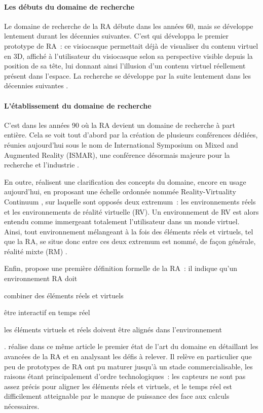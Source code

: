 \paragraph*{Les débuts du domaine de recherche}
Le domaine de recherche de la RA débute dans les années 60, mais se développe lentement durant les décennies suivantes. C'est \citet{Sutherland1968} qui développa le premier prototype de RA~: ce visiocasque permettait déjà de visualiser du contenu virtuel en 3D, affiché à l'utilisateur du visiocasque selon sa perspective visible depuis la position de sa tête, lui donnant ainsi l'illusion d'un contenu virtuel réellement présent dans l'espace. La recherche se développe par la suite lentement dans les décennies suivantes \citep{VanKrevelenPoelman2010} \citep{CarmignianiFurhtAnisettiEtAl2011}.

\paragraph*{L'établissement du domaine de recherche}
C'est dans les années 90 où la RA devient un domaine de recherche à part entière. Cela se voit tout d'abord par la création de plusieurs conférences dédiées, réunies aujourd'hui sous le nom de International Symposium on Mixed and Augmented Reality (ISMAR), une conférence désormais majeure pour la recherche et l'industrie \citep{AzumaBaillotBehringerEtAl2001}.

En outre, \citet{MilgramKishino1994} réalisent une clarification des concepts du domaine, encore en usage aujourd'hui, en proposant une échelle ordonnée nommée \foreignlanguage{english}{Reality-Virtuality Continuum} , sur laquelle sont opposés deux extremum~: les environnements réels et les environnements de réalité virtuelle (RV). Un environnement de RV est alors entendu comme immergeant totalement l'utilisateur dans un monde virtuel. Ainsi, tout environnement mélangeant à la fois des éléments réels et virtuels, tel que la RA, se situe donc entre ces deux extremum est nommé, de façon générale, réalité mixte (RM) \citep{MilgramKishino1994}.

Enfin, \citet{Azuma1997} propose une première définition formelle de la RA~: il indique qu'un environnement RA doit 
\begin{enumerate*}[label=\emph{\arabic*})]
	\item combiner des éléments réels et virtuels
	\item être interactif en temps réel
	\item les éléments virtuels et réels doivent être alignés dans l'environnement
\end{enumerate*}. 
\citeauthor{Azuma1997} réalise dans ce même article le premier état de l'art du domaine en détaillant les avancées de la RA et en analysant les défis à relever. Il relève en particulier que peu de prototypes de RA ont pu maturer jusqu'à un stade commercialisable, les raisons étant principalement d'ordre technologiques~: les capteurs ne sont pas assez précis pour aligner les éléments réels et virtuels, et le temps réel est difficilement atteignable par le manque de puissance des face aux calculs nécessaires.

